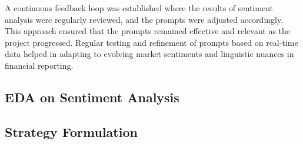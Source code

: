 A continuous feedback loop was established where the results of sentiment analysis were regularly reviewed, and the prompts were adjusted accordingly. This approach ensured that the prompts remained effective and relevant as the project progressed. Regular testing and refinement of prompts based on real-time data helped in adapting to evolving market sentiments and linguistic nuances in financial reporting.



\subsection{EDA on Sentiment Analysis}
\lipsum[6] 


\subsection{Strategy Formulation}
\lipsum[7] 